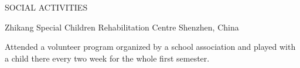 \begin{rubric}{SOCIAL ACTIVITIES}

\entry*[2017-2018]
	Zhikang Special Children Rehabilitation Centre \hfill Shenzhen, China \par
	Attended a volunteer program organized by a school association and played with a child there every two week for the whole first semester.
\end{rubric}
